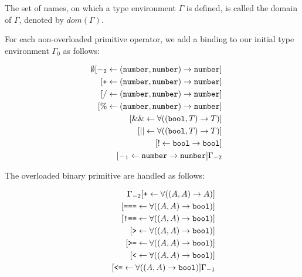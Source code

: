 The set of names, on which a type environment
$\Gamma$ is defined, is called the domain of $\Gamma$, 
denoted by $\textit{dom}(\Gamma)$.


For each non-overloaded primitive operator, we add a binding to our initial
type environment $\Gamma_0$ as follows:

\begin{eqnarray*}
& &
       \emptyset[ -_2 \leftarrow  (\texttt{number}, \texttt{number}) \rightarrow \texttt{number}]\\
&& \hspace{2mm} [ * \leftarrow  (\texttt{number}, \texttt{number}) \rightarrow \texttt{number}]\\
&& \hspace{2mm} [ / \leftarrow  (\texttt{number}, \texttt{number}) \rightarrow \texttt{number}]\\
&& \hspace{2mm} [ \% \leftarrow (\texttt{number}, \texttt{number}) \rightarrow \texttt{number}]\\
&& \hspace{2mm} [ \&\& \leftarrow \forall((\texttt{bool}, T) \rightarrow T)]\\
&& \hspace{2mm} [ || \leftarrow   \forall((\texttt{bool}, T) \rightarrow T)]\\
&& \hspace{2mm} [ ! \leftarrow \texttt{bool} \rightarrow \texttt{bool}]\\
&& \hspace{2mm} [ -_1 \leftarrow \texttt{number} \rightarrow \texttt{number}]\Gamma_{-2}
\end{eqnarray*}

The overloaded binary primitive are handled as follows:

\begin{eqnarray*}
 & &
      \Gamma_{-2}
                 [ \texttt{+} \leftarrow \forall((A, A) \rightarrow A)] \\
&& \hspace{6mm}  [ \texttt{===} \leftarrow \forall((A, A) \rightarrow \texttt{bool})] \\
&& \hspace{6mm}  [ \texttt{!==} \leftarrow \forall((A, A) \rightarrow \texttt{bool})] \\
&& \hspace{6mm}  [ \texttt{>} \leftarrow \forall((A, A) \rightarrow \texttt{bool})]\\
&& \hspace{6mm}  [ \texttt{>=} \leftarrow \forall((A, A) \rightarrow \texttt{bool})]\\
&& \hspace{6mm}  [ \texttt{<} \leftarrow \forall((A, A) \rightarrow \texttt{bool})] \\
&& \hspace{6mm}  [ \texttt{<=} \leftarrow \forall((A, A) \rightarrow \texttt{bool})]\Gamma_{-1}
\end{eqnarray*}

